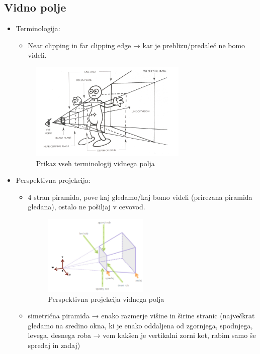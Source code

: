 \documentclass{article}
\begin{document}
\subsection{Vidno polje}
\begin{itemize}
    \item Terminologija:
        \begin{itemize}
            \item Near clipping in far clipping edge → kar je preblizu/predaleč ne bomo videli. 
        \end{itemize}
        \begin{figure}[H]
        \centering
        \includegraphics[width=75mm]{src/vidno_polje.png}
        \caption{Prikaz vseh terminologij vidnega polja}
        \end{figure}
    \item Perspektivna projekcija:
    \begin{itemize}
        \item 4 stran piramida, pove kaj gledamo/kaj bomo videli (prirezana piramida gledana), ostalo ne pošiljaj v cevovod.
        \begin{figure}[H]
        \centering
        \includegraphics[width=50mm]{src/vidno_polje_perspektivno.png}
        \caption{Perspektivna projekcija vidnega polja}
        \end{figure}   
        \item simetrična piramida → enako razmerje višine in širine stranic (največkrat gledamo na sredino okna, ki je enako oddaljena od zgornjega, spodnjega, levega, desnega roba → vem kakšen je vertikalni zorni kot, rabim samo še spredaj in zadaj)
        \begin{figure}[H]

\end{figure}
\end{itemize}
\end{itemize}
\end{document}
